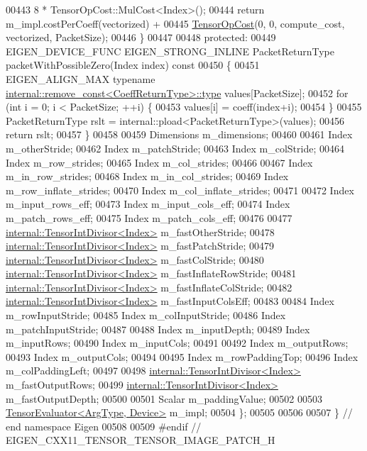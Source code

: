 \begin{DoxyCode}
00443                                 8 * TensorOpCost::MulCost<Index>();
00444     \textcolor{keywordflow}{return} m\_impl.costPerCoeff(vectorized) +
00445            \hyperlink{class_eigen_1_1_tensor_op_cost}{TensorOpCost}(0, 0, compute\_cost, vectorized, PacketSize);
00446   \}
00447 
00448  \textcolor{keyword}{protected}:
00449   EIGEN\_DEVICE\_FUNC EIGEN\_STRONG\_INLINE PacketReturnType packetWithPossibleZero(Index index)\textcolor{keyword}{ const}
00450 \textcolor{keyword}{  }\{
00451     EIGEN\_ALIGN\_MAX \textcolor{keyword}{typename} \hyperlink{group___sparse_core___module}{internal::remove\_const<CoeffReturnType>::type}
       values[PacketSize];
00452     \textcolor{keywordflow}{for} (\textcolor{keywordtype}{int} i = 0; i < PacketSize; ++i) \{
00453       values[i] = coeff(index+i);
00454     \}
00455     PacketReturnType rslt = internal::pload<PacketReturnType>(values);
00456     \textcolor{keywordflow}{return} rslt;
00457   \}
00458 
00459   Dimensions m\_dimensions;
00460 
00461   Index m\_otherStride;
00462   Index m\_patchStride;
00463   Index m\_colStride;
00464   Index m\_row\_strides;
00465   Index m\_col\_strides;
00466 
00467   Index m\_in\_row\_strides;
00468   Index m\_in\_col\_strides;
00469   Index m\_row\_inflate\_strides;
00470   Index m\_col\_inflate\_strides;
00471 
00472   Index m\_input\_rows\_eff;
00473   Index m\_input\_cols\_eff;
00474   Index m\_patch\_rows\_eff;
00475   Index m\_patch\_cols\_eff;
00476 
00477   \hyperlink{struct_eigen_1_1internal_1_1_tensor_int_divisor}{internal::TensorIntDivisor<Index>} m\_fastOtherStride;
00478   \hyperlink{struct_eigen_1_1internal_1_1_tensor_int_divisor}{internal::TensorIntDivisor<Index>} m\_fastPatchStride;
00479   \hyperlink{struct_eigen_1_1internal_1_1_tensor_int_divisor}{internal::TensorIntDivisor<Index>} m\_fastColStride;
00480   \hyperlink{struct_eigen_1_1internal_1_1_tensor_int_divisor}{internal::TensorIntDivisor<Index>} m\_fastInflateRowStride;
00481   \hyperlink{struct_eigen_1_1internal_1_1_tensor_int_divisor}{internal::TensorIntDivisor<Index>} m\_fastInflateColStride;
00482   \hyperlink{struct_eigen_1_1internal_1_1_tensor_int_divisor}{internal::TensorIntDivisor<Index>} m\_fastInputColsEff;
00483 
00484   Index m\_rowInputStride;
00485   Index m\_colInputStride;
00486   Index m\_patchInputStride;
00487 
00488   Index m\_inputDepth;
00489   Index m\_inputRows;
00490   Index m\_inputCols;
00491 
00492   Index m\_outputRows;
00493   Index m\_outputCols;
00494 
00495   Index m\_rowPaddingTop;
00496   Index m\_colPaddingLeft;
00497 
00498   \hyperlink{struct_eigen_1_1internal_1_1_tensor_int_divisor}{internal::TensorIntDivisor<Index>} m\_fastOutputRows;
00499   \hyperlink{struct_eigen_1_1internal_1_1_tensor_int_divisor}{internal::TensorIntDivisor<Index>} m\_fastOutputDepth;
00500 
00501   Scalar m\_paddingValue;
00502 
00503   \hyperlink{struct_eigen_1_1_tensor_evaluator}{TensorEvaluator<ArgType, Device>} m\_impl;
00504 \};
00505 
00506 
00507 \} \textcolor{comment}{// end namespace Eigen}
00508 
00509 \textcolor{preprocessor}{#endif // EIGEN\_CXX11\_TENSOR\_TENSOR\_IMAGE\_PATCH\_H}
\end{DoxyCode}
